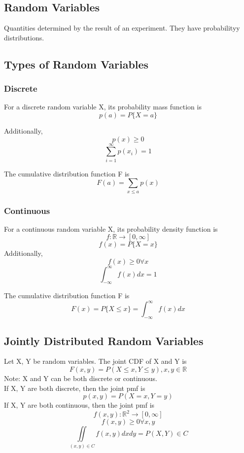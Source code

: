 \subsection{Random Variables}
\begin{defi}
    Quantities determined by the result of an experiment. They have probabilityy distributions.
\end{defi}
\subsection{Types of Random Variables}
\subsubsection{Discrete}
\begin{defi}
    For a discrete random variable X, its probability mass function is
    \[p(a) = P\{X=a\}\]

    Additionally, 
    \[p(x) \geq 0\]
    \[\sum_{i=1}^{\infty} p(x_i) = 1\]
\end{defi}
\begin{defi}
    The cumulative distribution function F is
    \[F(a) = \sum_{x\leq a}p(x)\]
\end{defi}
\subsubsection{Continuous}
\begin{defi}
    For a continuous random variable X, its probability density function is
    \[f:\mathbb{R}\rightarrow[0,\infty]\]
    \[f(x) = P\{X=x\}\]
    Additionally,
    \[f(x) \geq 0 \forall x\]
    \[\int_{-\infty}^{\infty}f(x)dx = 1\]
\end{defi}
\begin{defi}
    The cumulative distribution function F is
    \[F(x) = P\{X\leq x\} 
    = \int_{-\infty}^{\infty}f(x)dx\]
\end{defi}

\subsection{Jointly Distributed Random Variables}
Let X, Y be random variables. The joint CDF of X and Y is 
\[ F(x, y) = P(X\leq x, Y\leq y), x,y\in\mathbb{R} \]
Note: X and Y can be both discrete or continuous.\\

If X, Y are both discrete, then the joint pmf is
\[ p(x, y) = P(X=x, Y=y) \]
If X, Y are both continuous, then the joint pmf is
\[ f(x, y) : \mathbb{R}^2\rightarrow [0,\infty] \]
\[ f(x,y) \geq 0 \forall x,y \]
\[ \iint\limits_{(x,y)\in C} f(x,y) dxdy = P{(X,Y) \in C} \]

